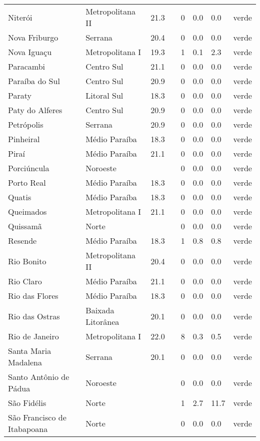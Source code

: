 \begin{longtable}{l|lllllll}
  Niterói & Metropolitana II & 21.3 &  & 0 & 0.0 & 0.0 & verde \\ 
  Nova Friburgo & Serrana & 20.4 &  & 0 & 0.0 & 0.0 & verde \\ 
  Nova Iguaçu & Metropolitana I & 19.3 &  & 1 & 0.1 & 2.3 & verde \\ 
  Paracambi & Centro Sul & 21.1 &  & 0 & 0.0 & 0.0 & verde \\ 
  Paraíba do Sul & Centro Sul & 20.9 &  & 0 & 0.0 & 0.0 & verde \\ 
  Paraty & Litoral Sul & 18.3 &  & 0 & 0.0 & 0.0 & verde \\ 
  Paty do Alferes & Centro Sul & 20.9 &  & 0 & 0.0 & 0.0 & verde \\ 
  Petrópolis & Serrana & 20.9 &  & 0 & 0.0 & 0.0 & verde \\ 
  Pinheiral & Médio Paraíba & 18.3 &  & 0 & 0.0 & 0.0 & verde \\ 
  Piraí & Médio Paraíba & 21.1 &  & 0 & 0.0 & 0.0 & verde \\ 
  Porciúncula & Noroeste &  &  & 0 & 0.0 & 0.0 & verde \\ 
  Porto Real & Médio Paraíba & 18.3 &  & 0 & 0.0 & 0.0 & verde \\ 
  Quatis & Médio Paraíba & 18.3 &  & 0 & 0.0 & 0.0 & verde \\ 
  Queimados & Metropolitana I & 21.1 &  & 0 & 0.0 & 0.0 & verde \\ 
  Quissamã & Norte &  &  & 0 & 0.0 & 0.0 & verde \\ 
  Resende & Médio Paraíba & 18.3 &  & 1 & 0.8 & 0.8 & verde \\ 
  Rio Bonito & Metropolitana II & 20.4 &  & 0 & 0.0 & 0.0 & verde \\ 
  Rio Claro & Médio Paraíba & 21.1 &  & 0 & 0.0 & 0.0 & verde \\ 
  Rio das Flores & Médio Paraíba & 18.3 &  & 0 & 0.0 & 0.0 & verde \\ 
  Rio das Ostras & Baixada Litorânea & 20.1 &  & 0 & 0.0 & 0.0 & verde \\ 
  Rio de Janeiro & Metropolitana I & 22.0 &  & 8 & 0.3 & 0.5 & verde \\ 
  Santa Maria Madalena & Serrana & 20.1 &  & 0 & 0.0 & 0.0 & verde \\ 
  Santo Antônio de Pádua & Noroeste &  &  & 0 & 0.0 & 0.0 & verde \\ 
  São Fidélis & Norte &  &  & 1 & 2.7 & 11.7 & verde \\ 
  São Francisco de Itabapoana & Norte &  &  & 0 & 0.0 & 0.0 & verde \\ 

\end{longtable}
